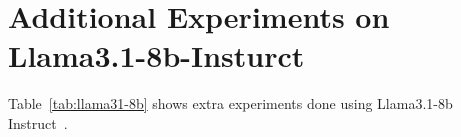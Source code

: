\section{Additional Experiments on Llama3.1-8b-Insturct}
\label{app:llama31}

Table~\ref{tab:llama31-8b} shows extra experiments done using Llama3.1-8b Instruct~\citep{dubey2024llama}.

